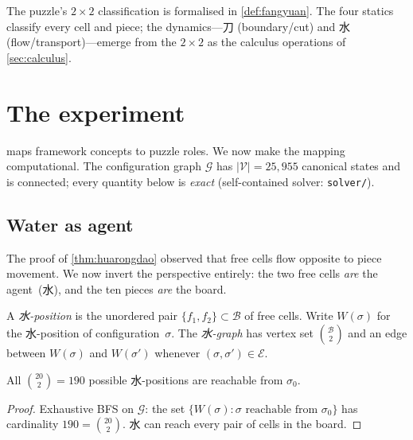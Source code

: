 \begin{remark}[方圆 $\times$ 黑白]\label{rem:fangyuan}
The puzzle's $2 \times 2$ classification is formalised in
\cref{def:fangyuan}. The four statics classify every cell and piece;
the dynamics---刀 (boundary/cut) and 水 (flow/transport)---emerge from
the $2 \times 2$ as the calculus operations of \cref{sec:calculus}.
\end{remark}

\section{The experiment}\label{sec:kpc}

 maps framework concepts to puzzle roles.
We now make the mapping computational.
The configuration graph $\mathcal{G}$ has
$|\mathcal{V}| = 25{,}955$ canonical states and is
connected; every quantity below is \emph{exact}
(self-contained solver: \texttt{solver/}).

\subsection*{Water as agent}

The proof of \cref{thm:huarongdao} observed that free cells
flow opposite to piece movement.
We now invert the perspective entirely:
the two free cells \emph{are} the agent~(水),
and the ten pieces \emph{are} the board.

\begin{definition}\label{def:water-graph}
A \emph{水-position} is the unordered pair
$\{f_1, f_2\} \subset \mathcal{B}$ of free cells.
Write $W(\sigma)$ for the 水-position of
configuration~$\sigma$.
The \emph{水-graph} has vertex set
$\binom{\mathcal{B}}{2}$ and an edge between
$W(\sigma)$ and $W(\sigma')$ whenever
$(\sigma, \sigma') \in \mathcal{E}$.
\end{definition}

\begin{proposition}[Ergodicity of 水]\label{thm:ergodic}
All $\binom{20}{2} = 190$ possible 水-positions are
reachable from $\sigma_0$.
\end{proposition}

\begin{proof}
Exhaustive BFS on $\mathcal{G}$: the set
$\{W(\sigma) : \sigma \text{ reachable from } \sigma_0\}$
has cardinality $190 = \binom{20}{2}$.
水 can reach every pair of cells in the board.
\end{proof}

